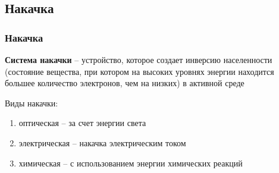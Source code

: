 \documentclass[10pt,pdf,hyperref={unicode}, dvipsnames]{beamer}
\newcommand\frametitless[1]{\subsection{#1}\frametitle{#1}}
\begin{document}
\begin{frame}[t]
	\frametitless{Накачка}
	\textbf{Система накачки} -- устройство, которое создает инверсию населенности (состояние вещества, при  котором на высоких уровнях энергии находится большее количество электронов, чем на низких) в активной среде

	\vspace{1em}
	Виды накачки: 
	\begin{enumerate}
		\item оптическая – за счет энергии света
		\item электрическая – накачка электрическим током
		\item химическая – с использованием энергии химических реакций
	\end{enumerate}
\end{frame}
\end{document}
